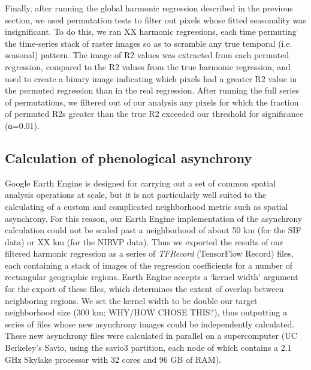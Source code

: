\documentclass[9pt,twocolumn,twoside,lineno]{pnas-new}
\begin{document}
{Finally, after running the global harmonic regression described in the
previous section, we used permutation tests to filter out pixels whose
fitted seasonality was insignificant. To do this, we ran XX harmonic
regressions, each time permuting the time-series stack of raster images
so as to scramble any true temporal (i.e. seasonal) pattern. The image of
R2 values was extracted from each permuted regression, compared to the R2
values from the true harmonic regression, and used to create a binary
image indicating which pixels had a greater R2 value in the permuted
regression than in the real regression. After running the full series of
permutations, we filtered out of our analysis any pixels for which the
fraction of permuted R2s greater than the true R2 exceeded our threshold
for significance (ɑ=0.01).

\subsection*{Calculation of phenological asynchrony}
Google Earth Engine is designed for carrying out a set of common spatial
analysis operations at scale, but it is not particularly well suited to
the calculating of a custom and complicated neighborhood metric such as
spatial asynchrony. For this reason, our Earth Engine implementation of
the asynchrony calculation could not be scaled past a neighborhood of
about 50 km (for the SIF data) or XX km (for the NIRVP data). Thus we
exported the results of our filtered harmonic regression as a series of
\textit{TFRecord} (TensorFlow Record) files, each containing a stack of images of
the regression coefficients for a number of rectangular geographic
regions. Earth Engine accepts a ‘kernel width’ argument for the export of
these files, which determines the extent of overlap between neighboring
regions. We set the kernel width to be double our target neighborhood
size (300 km; WHY/HOW CHOSE THIS?), thus outputting a series of files
whose new asynchrony images could be independently calculated. These new
asynchrony files were calculated in parallel on a supercomputer (UC
Berkeley’s Savio, using the savio3 partition, each node of which contains
a 2.1 GHz Skylake processor with 32 cores and 96 GB of RAM).

}
\end{document}
